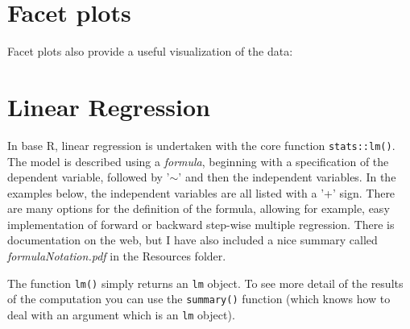 \documentclass[titlepage]{book}\usepackage{knitr}
\begin{document}
\section{Facet plots}
Facet plots also provide a useful visualization of the data:

\begin{knitrout}
\color{fgcolor}\begin{kframe}
\begin{alltt}
 \hlstd{(}     \hlopt{+}
  \hlstd{()} \hlopt{+}
  \hlstd{(}\hlopt{~}  \hlstd{=} \hlstd{)}
\end{alltt}
\end{kframe}
\end{knitrout}


\section{Linear Regression} 

In base R, linear regression is undertaken with the core function \texttt{stats::lm()}. The model is described using a \textsl{formula}, beginning with a specification of the dependent variable, followed by '$\sim$' and then the independent variables. In the examples below, the independent variables are all listed with a '+' sign. There are many options for the definition of the formula, allowing for example, easy implementation of forward or backward step-wise multiple regression.  There is documentation on the web, but I have also included a nice summary called \textsl{formulaNotation.pdf} in the Resources folder.

\begin{knitrout}
\color{fgcolor}\begin{kframe}
\begin{alltt}
 \hlkwb{<-} \hlopt{~}\hlopt{+} 
\end{alltt}
\end{kframe}
\end{knitrout}

The function \texttt{lm()} simply returns an \texttt{lm} object.  To see more detail of the results of the computation you can use the  \texttt{summary()} function (which knows how to deal with an argument which is an \texttt{lm} object). 
\end{document}
